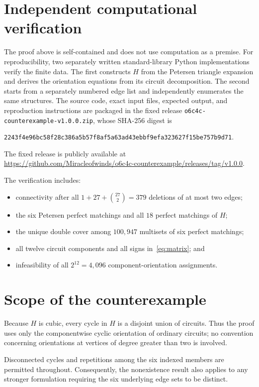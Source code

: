 \documentclass[11pt]{article}
\theoremstyle{definition}
\begin{document}
\section{Independent computational verification}

The proof above is self-contained and does not use computation as a premise.
For reproducibility, two separately written standard-library Python
implementations verify the finite data.  The first constructs $H$ from the
Petersen triangle expansion and derives the orientation equations from its
circuit decomposition.  The second starts from a separately numbered edge
list and independently enumerates the same structures.  The source code,
exact input files, expected output, and reproduction instructions are
packaged in the fixed release
\texttt{o6c4c-counterexample-v1.0.0.zip}, whose SHA-256 digest is
\begin{center}
\small\texttt{2243f4e96bc58f28c386a5b57f8af5a63ad43ebbf9efa323627f15be757b9d71}.
\end{center}
The fixed release is publicly available at
\url{https://github.com/Miracleofwinds/o6c4c-counterexample/releases/tag/v1.0.0}.

The verification includes:
\begin{itemize}[leftmargin=*,itemsep=0.2em]
\item connectivity after all $1+27+\binom{27}{2}=379$ deletions of at most two
      edges;
\item the six Petersen perfect matchings and all $18$ perfect matchings of $H$;
\item the unique double cover among $100{,}947$ multisets of six perfect
      matchings;
\item all twelve circuit components and all signs in~\eqref{eq:matrix}; and
\item infeasibility of all $2^{12}=4{,}096$ component-orientation assignments.
\end{itemize}

\section{Scope of the counterexample}

Because $H$ is cubic, every cycle in $H$ is a disjoint union of circuits.
Thus the proof uses only the componentwise cyclic orientation of ordinary
circuits; no convention concerning orientations at vertices of degree greater
than two is involved.

Disconnected cycles and repetitions among the six indexed members are
permitted throughout.  Consequently, the nonexistence result also applies to
any stronger formulation requiring the six underlying edge sets to be
distinct.
\end{document}
